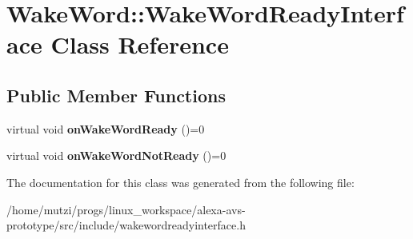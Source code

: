 \hypertarget{classWakeWord_1_1WakeWordReadyInterface}{}\section{Wake\+Word\+:\+:Wake\+Word\+Ready\+Interface Class Reference}
\label{classWakeWord_1_1WakeWordReadyInterface}
\subsection*{Public Member Functions}
\begin{DoxyCompactItemize}
\item 
\mbox{\label{classWakeWord_1_1WakeWordReadyInterface_a19e66fc2d8fc807d1d8bdf636a0565ef}} 
virtual void {\bfseries on\+Wake\+Word\+Ready} ()=0
\item 
\mbox{\label{classWakeWord_1_1WakeWordReadyInterface_ae98bf3af62b41e28f491f623f0748488}} 
virtual void {\bfseries on\+Wake\+Word\+Not\+Ready} ()=0
\end{DoxyCompactItemize}


The documentation for this class was generated from the following file\+:\begin{DoxyCompactItemize}
\item 
/home/mutzi/progs/linux\+\_\+workspace/alexa-\/avs-\/prototype/src/include/wakewordreadyinterface.\+h\end{DoxyCompactItemize}
